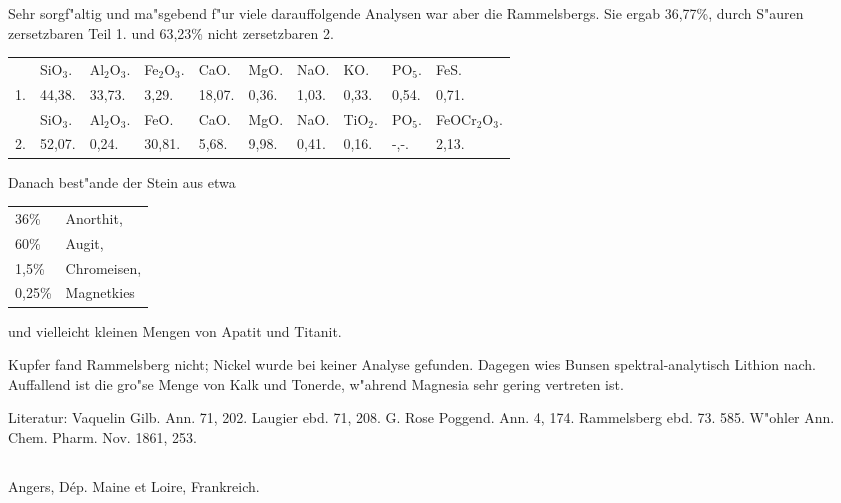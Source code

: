 \documentclass[a4paper, 11pt, oneside]{article}
\begin{document}
Sehr sorgf"altig und ma"sgebend f"ur viele darauffolgende Analysen war aber die Rammelsbergs. Sie ergab 36,77\%, durch S"auren zersetzbaren Teil 1. und 63,23\% nicht zersetzbaren 2.
\begin{table}[!ht]
    \centering\swabfamily\Large
    \normalsize    
    \begin{tabular}{l l l l l l l l l l}
         & SiO$_{3}$. & Al$_{2}$O$_{3}$. & Fe$_{2}$O$_{3}$. & CaO. & MgO. & NaO. & KO. & PO$_{5}$. & FeS. \\
        1. & 44,38. & 33,73. & 3,29. & 18,07. & 0,36. & 1,03. & 0,33. & 0,54. & 0,71. \\ \hline
         & SiO$_{3}$. & Al$_{2}$O$_{3}$. & FeO. & CaO. & MgO. & NaO. & TiO$_{2}$. & PO$_{5}$. & FeOCr$_{2}$O$_{3}$. \\
        2. & 52,07. & 0,24. & 30,81. & 5,68. & 9,98. & 0,41. & 0,16. & -,-. & 2,13. \\
    \end{tabular}
\end{table}

Danach best"ande der Stein aus etwa
\begin{table}[!ht]
    \centering\swabfamily\Large
    \begin{tabular}{l l}
        36\% & Anorthit, \\
        60\% & Augit, \\
        1,5\% & Chromeisen, \\
        0,25\% & Magnetkies \\
    \end{tabular}
\end{table}

und vielleicht kleinen Mengen von Apatit und Titanit.

Kupfer fand Rammelsberg nicht; Nickel wurde bei keiner Analyse gefunden. Dagegen wies Bunsen spektral-analytisch Lithion nach. Auffallend ist die gro"se Menge von Kalk und Tonerde, w"ahrend Magnesia sehr gering vertreten ist.

\normalsize
Literatur: Vaquelin Gilb. Ann. 71, 202. Laugier ebd. 71, 208. G. Rose Poggend. Ann. 4, 174. Rammelsberg ebd. 73. 585. W"ohler Ann. Chem. Pharm. Nov. 1861, 253.
\subsection{}
\LARGE
\paragraph{}
Angers, Dép. Maine et Loire, Frankreich.
\end{document}
